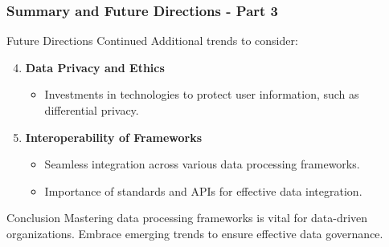 \documentclass[aspectratio=169]{beamer}
\begin{document}
\begin{frame}[fragile]
    \frametitle{Summary and Future Directions - Part 3}
    \begin{block}{Future Directions Continued}
        Additional trends to consider:
    \end{block}

    \begin{enumerate}
        \setcounter{enumi}{3}
        \item \textbf{Data Privacy and Ethics}
        \begin{itemize}
            \item Investments in technologies to protect user information, such as differential privacy.
        \end{itemize}

        \item \textbf{Interoperability of Frameworks}
        \begin{itemize}
            \item Seamless integration across various data processing frameworks.
            \item Importance of standards and APIs for effective data integration.
        \end{itemize}
    \end{enumerate}

    \begin{block}{Conclusion}
        Mastering data processing frameworks is vital for data-driven organizations. Embrace emerging trends to ensure effective data governance.
    \end{block}
\end{frame}
\end{document}

